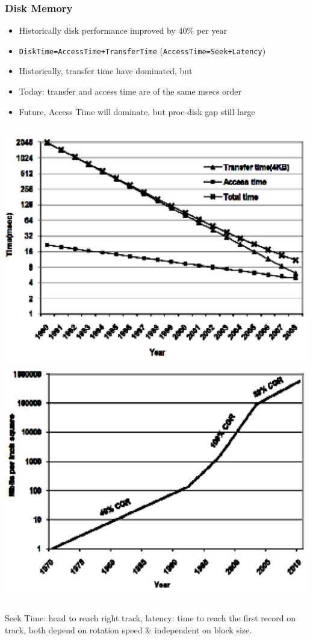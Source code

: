 \documentclass{beamer}
\renewcommand{\emph}[1]{\textcolor{structure}{#1}}
\begin{document}
\begin{frame}[fragile,t]
\frametitle{Disk Memory}

\begin{itemize}
            \item \emph{Historically disk performance improved by $40\%$ per year} \smallskip

            \item {\tt DiskTime=AccessTime+TransferTime} ({\scriptsize {\tt AccessTime=Seek+Latency}})

            \item Historically, transfer time have dominated, but

            \item Today: transfer and access time are of the same \alert{msecs} order
    
            \item Future, Access Time will dominate, but proc-disk gap still large
\end  {itemize}

\begin{columns}
\includegraphics[width=33ex]{Figures/L1/DISK}
\includegraphics[width=33ex]{Figures/L1/Disk2}
\end{columns}

{\scriptsize Seek Time: head to reach right track, latency: time to reach the first record on track, both depend on rotation speed \& independent on block size}.

\end{frame}
\end{document}
